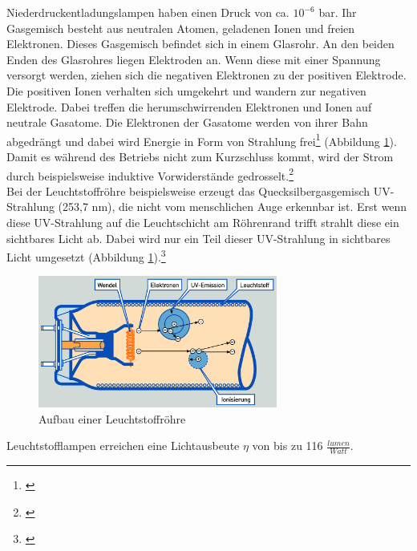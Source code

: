 \noindent Niederdruckentladungslampen haben einen Druck von ca. $10^{-6}$ bar. Ihr Gasgemisch besteht aus neutralen Atomen, geladenen Ionen und freien Elektronen. Dieses Gasgemisch befindet sich in einem Glasrohr. An den beiden Enden des Glasrohres liegen Elektroden an. Wenn diese mit einer Spannung versorgt werden, ziehen sich die negativen Elektronen zu der positiven Elektrode. Die positiven Ionen verhalten sich umgekehrt und wandern zur negativen Elektrode. Dabei treffen die herumschwirrenden Elektronen und Ionen auf neutrale Gasatome. Die Elektronen der Gasatome werden von ihrer Bahn abgedrängt und dabei wird Energie in Form von Strahlung frei\footnote{\cite[93]{ris}} (Abbildung \ref{b_leuchtstoff}). Damit es während des Betriebs nicht zum Kurzschluss kommt, wird der Strom durch beispielsweise induktive Vorwiderstände gedrosselt.\footnote{\cite[141]{mueller}}\\
Bei der Leuchtstoffröhre beispielsweise erzeugt das Quecksilbergasgemisch UV-Strahlung (253,7 nm), die nicht vom menschlichen Auge erkennbar ist. Erst wenn diese UV-Strahlung auf die Leuchtschicht am Röhrenrand trifft strahlt diese ein sichtbares Licht ab. Dabei wird nur ein Teil dieser UV-Strahlung in sichtbares Licht umgesetzt (Abbildung \ref{b_leuchtstoff}).\footnote{\cite[96]{ris}}

\begin{figure}[htp]     %
\centering
\includegraphics[width=0.7\textwidth]{bilder/leuchtstoff} 
\caption {Aufbau einer Leuchtstoffröhre\protect\footnotemark}\label{b_leuchtstoff}
\end{figure}

\noindent Leuchtstofflampen erreichen eine Lichtausbeute $\eta$ von bis zu 116 $\frac{lumen}{Watt}$.\\

